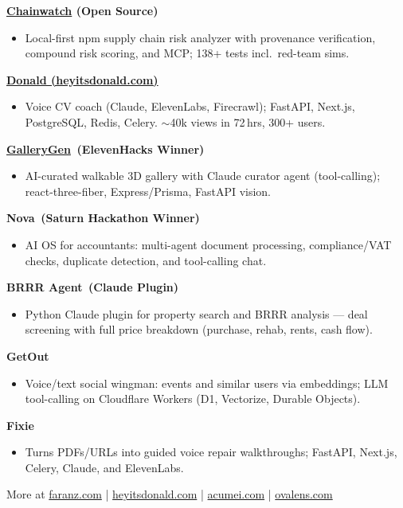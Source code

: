 \documentclass[10pt,a4paper]{article}
\newcommand{\cvmeta}[1]{\small #1}
\newcommand{\cvproject}[2]{\textbf{#1} \hfill \textit{#2}}
\newcommand{\smallgap}{\vspace{0.5pt}}
\begin{document}
\cvproject{\href{https://watchman-rust.vercel.app/}{Chainwatch} (Open Source)}{}
\begin{itemize}
  \item Local-first npm supply chain risk analyzer with provenance verification, compound risk scoring, and MCP; 138+ tests incl.\ red-team sims.
\end{itemize}
\smallgap

\cvproject{\href{https://heyitsdonald.com}{Donald (heyitsdonald.com)}}{}
\begin{itemize}
  \item Voice CV coach (Claude, ElevenLabs, Firecrawl); FastAPI, Next.js, PostgreSQL, Redis, Celery. \(\sim\)40k views in 72\,hrs, 300+ users.
\end{itemize}
\smallgap

\cvproject{\href{https://ai-gallery-sooty.vercel.app/}{GalleryGen} \,(ElevenHacks Winner)}{}
\begin{itemize}
  \item AI-curated walkable 3D gallery with Claude curator agent (tool-calling); react-three-fiber, Express/Prisma, FastAPI vision.
\end{itemize}
\smallgap

\cvproject{Nova \,(Saturn Hackathon Winner)}{}
\begin{itemize}
  \item AI OS for accountants: multi-agent document processing, compliance/VAT checks, duplicate detection, and tool-calling chat.
\end{itemize}
\smallgap

\cvproject{BRRR Agent \,(Claude Plugin)}{}
\begin{itemize}
  \item Python Claude plugin for property search and BRRR analysis --- deal screening with full price breakdown (purchase, rehab, rents, cash flow).
\end{itemize}
\smallgap

\cvproject{GetOut}{}
\begin{itemize}
  \item Voice/text social wingman: events and similar users via embeddings; LLM tool-calling on Cloudflare Workers (D1, Vectorize, Durable Objects).
\end{itemize}
\smallgap

\cvproject{Fixie}{}
\begin{itemize}
  \item Turns PDFs/URLs into guided voice repair walkthroughs; FastAPI, Next.js, Celery, Claude, and ElevenLabs.
\end{itemize}

\vspace{2pt}
\cvmeta{More at \href{https://faranz.com}{faranz.com} \;|\; \href{https://heyitsdonald.com}{heyitsdonald.com} \;|\; \href{https://acumei.com}{acumei.com} \;|\; \href{https://ovalens.com}{ovalens.com}}
\end{document}
